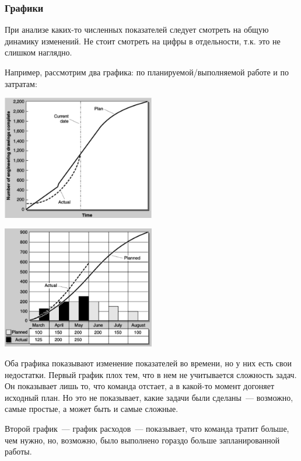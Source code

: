 \documentclass{../../text-style}
\begin{document}
\subsubsection{Графики}

При анализе каких-то численных показателей следует смотреть на общую динамику изменений. Не стоит смотреть на цифры в отдельности, т.к. это не слишком наглядно.

Например, рассмотрим два графика: по планируемой/выполняемой работе и по затратам:

\begin{center}
    \includegraphics[width=0.5\textwidth]{plannedWorkGraph.png}
\end{center}

\begin{center}
    \includegraphics[width=0.5\textwidth]{costGraph.png}
\end{center}

Оба графика показывают изменение показателей во времени, но у них есть свои недостатки. Первый график плох тем, что в нем не учитывается сложность задач. Он показывает лишь то, что команда отстает, а в какой-то момент догоняет исходный план. Но это не показывает, какие задачи были сделаны~--- возможно, самые простые, а может быть и самые сложные.

Второй график~--- график расходов~--- показывает, что команда тратит больше, чем нужно, но, возможно, было выполнено гораздо больше запланированной работы.
\end{document}

